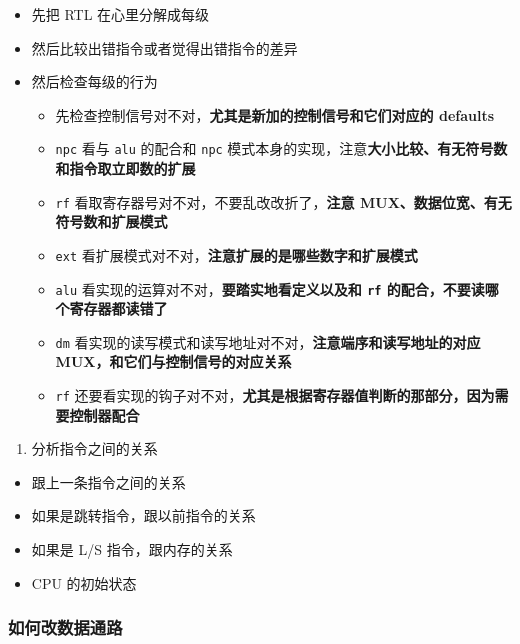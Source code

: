 \begin{itemize}
\tightlist
\item
  先把 RTL 在心里分解成每级
\item
  然后比较出错指令或者觉得出错指令的差异
\item
  然后检查每级的行为

  \begin{itemize}
  \tightlist
  \item
    先检查控制信号对不对，\textbf{尤其是新加的控制信号和它们对应的
    defaults}
  \item
    \texttt{npc} 看与 \texttt{alu} 的配合和 \texttt{npc}
    模式本身的实现，注意\textbf{大小比较、有无符号数和指令取立即数的扩展}
  \item
    \texttt{rf} 看取寄存器号对不对，不要乱改改折了，\textbf{注意
    MUX、数据位宽、有无符号数和扩展模式}
  \item
    \texttt{ext}
    看扩展模式对不对，\textbf{注意扩展的是哪些数字和扩展模式}
  \item
    \texttt{alu} 看实现的运算对不对，\textbf{要踏实地看定义以及和
    \texttt{rf} 的配合，不要读哪个寄存器都读错了}
  \item
    \texttt{dm}
    看实现的读写模式和读写地址对不对，\textbf{注意端序和读写地址的对应
    MUX，和它们与控制信号的对应关系}
  \item
    \texttt{rf}
    还要看实现的钩子对不对，\textbf{尤其是根据寄存器值判断的那部分，因为需要控制器配合}
  \end{itemize}
\end{itemize}

\begin{enumerate}
\def\labelenumi{\arabic{enumi}.}
\setcounter{enumi}{2}
\tightlist
\item
  分析指令之间的关系
\end{enumerate}

\begin{itemize}
\tightlist
\item
  跟上一条指令之间的关系
\item
  如果是跳转指令，跟以前指令的关系
\item
  如果是 L/S 指令，跟内存的关系
\item
  CPU 的初始状态
\end{itemize}

\hypertarget{ux5982ux4f55ux6539ux6570ux636eux901aux8def}{%
\subsubsection{如何改数据通路}\label{ux5982ux4f55ux6539ux6570ux636eux901aux8def}}

